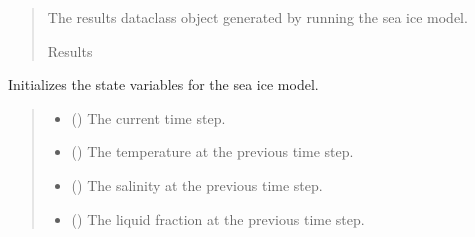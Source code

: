 \documentclass[a4paper,11pt,english,openany]{sphinxmanual}
\begin{document}
\begin{fulllineitems}
\begin{fulllineitems}
\begin{quote}
\begin{description}
\begin{itemize}
\end{itemize}

\sphinxAtStartPar
The results dataclass object generated by running the sea ice model.

\sphinxAtStartPar
Results

\end{description}\end{quote}

\end{fulllineitems}


\begin{fulllineitems}
\label{\detokenize{api/spyice.models.sea_ice_model:src.spyice.models.sea_ice_model.SeaIceModel.initialize_state_variables}}
\pysigstartsignatures
\pysiglinewithargsret
{}
{\sphinxparamcomma {}\sphinxparamcomma {}\sphinxparamcomma {}}
{}
\pysigstopsignatures
\sphinxAtStartPar
Initializes the state variables for the sea ice model.
\begin{quote}\begin{description}
\begin{itemize}
\item {} 
\sphinxAtStartPar
{} () \textendash{} The current time step.

\item {} 
\sphinxAtStartPar
{} () \textendash{} The temperature at the previous time step.

\item {} 
\sphinxAtStartPar
{} () \textendash{} The salinity at the previous time step.

\item {} 
\sphinxAtStartPar
{} () \textendash{} The liquid fraction at the previous time step.


\end{itemize}
\end{description}
\end{quote}
\end{fulllineitems}
\end{fulllineitems}
\end{document}
